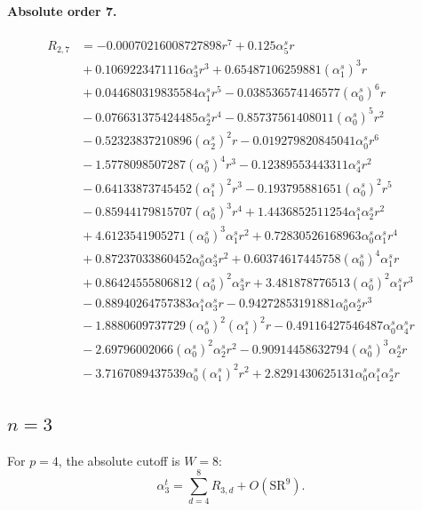 \documentclass[10pt]{article}
\begin{document}
\paragraph{Absolute order 7.}
\begin{align*}
R_{2,7} &=  - 0.00070216008727898 r^{7} + 0.125 \alpha_{5}^s r \\
&{}  + 0.1069223471116 \alpha_{3}^s r^{3} + 0.65487106259881 \left(\alpha_{1}^s\right)^{3} r \\
&{}  + 0.044680319835584 \alpha_{1}^s r^{5} - 0.038536574146577 \left(\alpha_{0}^s\right)^{6} r \\
&{}  - 0.076631375424485 \alpha_{2}^s r^{4} - 0.85737561408011 \left(\alpha_{0}^s\right)^{5} r^{2} \\
&{}  - 0.52323837210896 \left(\alpha_{2}^s\right)^{2} r - 0.019279820845041 \alpha_{0}^s r^{6} \\
&{}  - 1.5778098507287 \left(\alpha_{0}^s\right)^{4} r^{3} - 0.12389553443311 \alpha_{4}^s r^{2} \\
&{}  - 0.64133873745452 \left(\alpha_{1}^s\right)^{2} r^{3} - 0.193795881651 \left(\alpha_{0}^s\right)^{2} r^{5} \\
&{}  - 0.85944179815707 \left(\alpha_{0}^s\right)^{3} r^{4} + 1.4436852511254 \alpha_{1}^s \alpha_{2}^s r^{2} \\
&{}  + 4.6123541905271 \left(\alpha_{0}^s\right)^{3} \alpha_{1}^s r^{2} + 0.72830526168963 \alpha_{0}^s \alpha_{1}^s r^{4} \\
&{}  + 0.87237033860452 \alpha_{0}^s \alpha_{3}^s r^{2} + 0.60374617445758 \left(\alpha_{0}^s\right)^{4} \alpha_{1}^s r \\
&{}  + 0.86424555806812 \left(\alpha_{0}^s\right)^{2} \alpha_{3}^s r + 3.481878776513 \left(\alpha_{0}^s\right)^{2} \alpha_{1}^s r^{3} \\
&{}  - 0.88940264757383 \alpha_{1}^s \alpha_{3}^s r - 0.94272853191881 \alpha_{0}^s \alpha_{2}^s r^{3} \\
&{}  - 1.8880609737729 \left(\alpha_{0}^s\right)^{2} \left(\alpha_{1}^s\right)^{2} r - 0.49116427546487 \alpha_{0}^s \alpha_{4}^s r \\
&{}  - 2.69796002066 \left(\alpha_{0}^s\right)^{2} \alpha_{2}^s r^{2} - 0.90914458632794 \left(\alpha_{0}^s\right)^{3} \alpha_{2}^s r \\
&{}  - 3.7167089437539 \alpha_{0}^s \left(\alpha_{1}^s\right)^{2} r^{2} + 2.8291430625131 \alpha_{0}^s \alpha_{1}^s \alpha_{2}^s r
\end{align*}

\subsection{$n=3$}
For $p=4$, the absolute cutoff is $W=8$:
\[\alpha_{3}^t=\sum_{d=4}^{8}R_{3,d}+O(\mathrm{SR}^{9}).\]
\end{document}
